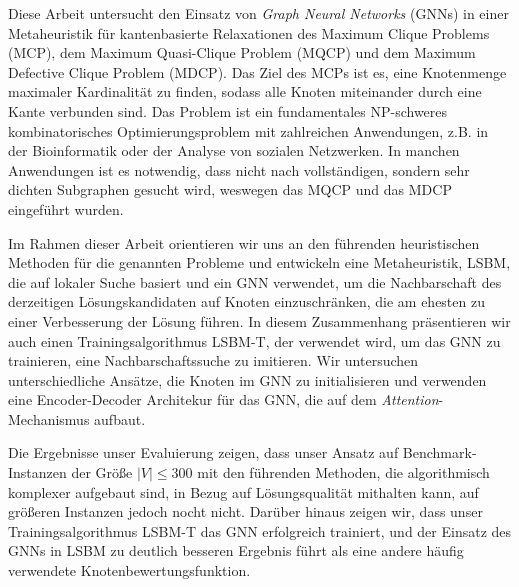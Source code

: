 \documentclass[draft,final]{vutinfth} %
\begin{document}
\begin{kurzfassung}
Diese Arbeit untersucht den Einsatz von \emph{Graph Neural Networks} (GNNs) in einer Metaheuristik für kantenbasierte Relaxationen des Maximum Clique Problems (MCP), dem Maximum Quasi-Clique Problem (MQCP) und dem Maximum Defective Clique Problem (MDCP). 
Das Ziel des MCPs ist es, eine Knotenmenge maximaler Kardinalität zu finden, sodass alle Knoten miteinander durch eine Kante verbunden sind. Das Problem ist ein fundamentales NP-schweres kombinatorisches Optimierungsproblem mit zahlreichen Anwendungen, z.B. in der Bioinformatik oder der Analyse von sozialen Netzwerken. 
In manchen Anwendungen ist es notwendig, dass nicht nach vollständigen, sondern sehr dichten Subgraphen gesucht wird, weswegen das MQCP und das MDCP eingeführt wurden. 

Im Rahmen dieser Arbeit orientieren wir uns an den führenden heuristischen Methoden für die genannten Probleme und entwickeln eine Metaheuristik, LSBM, die auf lokaler Suche basiert und ein GNN verwendet, um die Nachbarschaft des derzeitigen Lösungskandidaten auf Knoten einzuschränken, die am ehesten zu einer Verbesserung der Lösung führen. In diesem Zusammenhang präsentieren wir auch einen Trainingsalgorithmus LSBM-T, der verwendet wird, um das GNN zu trainieren, eine Nachbarschaftssuche zu imitieren. Wir untersuchen unterschiedliche Ansätze, die Knoten im GNN zu initialisieren und verwenden eine Encoder-Decoder Architekur für das GNN, die auf dem \emph{Attention}-Mechanismus aufbaut. 

Die Ergebnisse unser Evaluierung zeigen, dass unser Ansatz auf Benchmark-Instanzen der Größe $|V| \leq 300$ mit den führenden Methoden, die algorithmisch komplexer aufgebaut sind, in Bezug auf Lösungsqualität mithalten kann, auf größeren Instanzen jedoch nocht nicht. 
Darüber hinaus zeigen wir, dass unser Trainingsalgorithmus LSBM-T das GNN erfolgreich trainiert, und der Einsatz des GNNs in LSBM zu deutlich besseren Ergebnis führt als eine andere häufig verwendete Knotenbewertungsfunktion. 
\end{kurzfassung}
\end{document}
